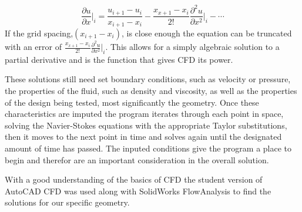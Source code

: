\documentclass{report}
\begin{document}
\begin{equation}
\frac{\partial{u}}{\partial{x}}\bigg|_i=\frac{u_{i+1}-u_{i}}{x_{i+1}-x_i}-\frac{x_{x+1}-x_i}{2!}\frac{\partial^2u}{\partial x^2}\bigg|_i-\cdots
\end{equation}
If the grid spacing,$(x_{i+1}-x_i)$, is close enough the equation can be truncated with an error of $\frac{x_{x+1}-x_i}{2!}\frac{\partial^2u}{\partial x^2}\big|_i$. This allows for a simply algebraic solution to a partial derivative and is the function that gives CFD its power.\par
These solutions still need set boundary conditions, such as velocity or pressure, the properties of the fluid, such as density and viscosity, as well as the properties of the design being tested, most significantly the geometry. Once these characteristics are imputed the program iterates through each point in space, solving the Navier-Stokes equations with the appropriate Taylor substitutions, then it moves to the next point in time and solves again until the designated amount of time has passed. The inputed conditions give the program a place to begin and therefor are an important consideration in the overall solution.\par
With a good understanding of the basics of CFD the student version of AutoCAD CFD was used along with SolidWorks FlowAnalysis to find the solutions for our specific geometry. 
\end{document}
